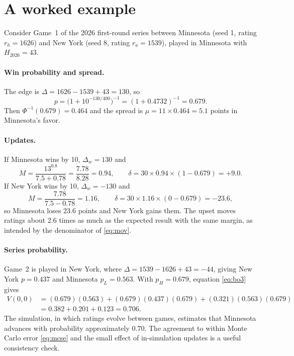 \documentclass[11pt]{article}
\newcommand{\Kval}{30}             %
\newcommand{\sigmaval}{11}         %
\theoremstyle{plain}
\theoremstyle{definition}
\theoremstyle{remark}
\begin{document}
\section{A worked example}\label{app:example}

Consider Game~1 of the 2026 first-round series between Minnesota (seed 1, rating $r_h = 1626$) and New York (seed 8, rating $r_a = 1539$), played in Minnesota with $H_{2026} = 43$.

\paragraph{Win probability and spread.} The edge is $\Delta = 1626 - 1539 + 43 = 130$, so
\[
  p = \bigl(1 + 10^{-130/400}\bigr)^{-1} = (1 + 0.4732)^{-1} = 0.679.
\]
Then $\Phi^{-1}(0.679) = 0.464$ and the spread is $\mu = \sigmaval \times 0.464 = 5.1$ points in Minnesota's favor.

\paragraph{Updates.} If Minnesota wins by 10, $\Delta_w = 130$ and
\[
  M = \frac{13^{0.8}}{7.5 + 0.78} = \frac{7.78}{8.28} = 0.94, \qquad \delta = \Kval \times 0.94 \times (1 - 0.679) = +9.0.
\]
If New York wins by 10, $\Delta_w = -130$ and
\[
  M = \frac{7.78}{7.5 - 0.78} = 1.16, \qquad \delta = \Kval \times 1.16 \times (0 - 0.679) = -23.6,
\]
so Minnesota loses 23.6 points and New York gains them. The upset moves ratings about 2.6 times as much as the expected result with the same margin, as intended by the denominator of \eqref{eq:mov}.

\paragraph{Series probability.} Game~2 is played in New York, where $\Delta = 1539 - 1626 + 43 = -44$, giving New York $p = 0.437$ and Minnesota $p_L = 0.563$. With $p_H = 0.679$, equation \eqref{eq:bo3} gives
\begin{align*}
  V(0,0) &= (0.679)(0.563) + (0.679)(0.437)(0.679) + (0.321)(0.563)(0.679)\\
         &= 0.382 + 0.201 + 0.123 = 0.706.
\end{align*}
The simulation, in which ratings evolve between games, estimates that Minnesota advances with probability approximately $0.70$. The agreement to within Monte Carlo error \eqref{eq:mcse} and the small effect of in-simulation updates is a useful consistency check.
\end{document}
